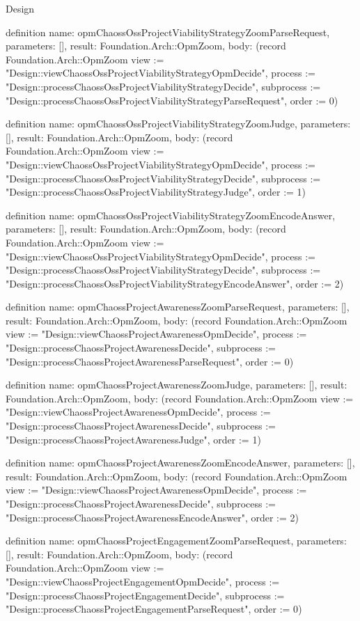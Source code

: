 \begin{lexlean}{Design}
\begin{semanticmodule}
definition{
  name: opmChaossOssProjectViabilityStrategyZoomParseRequest,
  parameters: [],
  result: Foundation.Arch::OpmZoom,
  body: (record Foundation.Arch::OpmZoom {view := "Design::viewChaossOssProjectViabilityStrategyOpmDecide", process := "Design::processChaossOssProjectViabilityStrategyDecide", subprocess := "Design::processChaossOssProjectViabilityStrategyParseRequest", order := 0})
}

definition{
  name: opmChaossOssProjectViabilityStrategyZoomJudge,
  parameters: [],
  result: Foundation.Arch::OpmZoom,
  body: (record Foundation.Arch::OpmZoom {view := "Design::viewChaossOssProjectViabilityStrategyOpmDecide", process := "Design::processChaossOssProjectViabilityStrategyDecide", subprocess := "Design::processChaossOssProjectViabilityStrategyJudge", order := 1})
}

definition{
  name: opmChaossOssProjectViabilityStrategyZoomEncodeAnswer,
  parameters: [],
  result: Foundation.Arch::OpmZoom,
  body: (record Foundation.Arch::OpmZoom {view := "Design::viewChaossOssProjectViabilityStrategyOpmDecide", process := "Design::processChaossOssProjectViabilityStrategyDecide", subprocess := "Design::processChaossOssProjectViabilityStrategyEncodeAnswer", order := 2})
}

definition{
  name: opmChaossProjectAwarenessZoomParseRequest,
  parameters: [],
  result: Foundation.Arch::OpmZoom,
  body: (record Foundation.Arch::OpmZoom {view := "Design::viewChaossProjectAwarenessOpmDecide", process := "Design::processChaossProjectAwarenessDecide", subprocess := "Design::processChaossProjectAwarenessParseRequest", order := 0})
}

definition{
  name: opmChaossProjectAwarenessZoomJudge,
  parameters: [],
  result: Foundation.Arch::OpmZoom,
  body: (record Foundation.Arch::OpmZoom {view := "Design::viewChaossProjectAwarenessOpmDecide", process := "Design::processChaossProjectAwarenessDecide", subprocess := "Design::processChaossProjectAwarenessJudge", order := 1})
}

definition{
  name: opmChaossProjectAwarenessZoomEncodeAnswer,
  parameters: [],
  result: Foundation.Arch::OpmZoom,
  body: (record Foundation.Arch::OpmZoom {view := "Design::viewChaossProjectAwarenessOpmDecide", process := "Design::processChaossProjectAwarenessDecide", subprocess := "Design::processChaossProjectAwarenessEncodeAnswer", order := 2})
}

definition{
  name: opmChaossProjectEngagementZoomParseRequest,
  parameters: [],
  result: Foundation.Arch::OpmZoom,
  body: (record Foundation.Arch::OpmZoom {view := "Design::viewChaossProjectEngagementOpmDecide", process := "Design::processChaossProjectEngagementDecide", subprocess := "Design::processChaossProjectEngagementParseRequest", order := 0})
}


\end{semanticmodule}
\end{lexlean}
